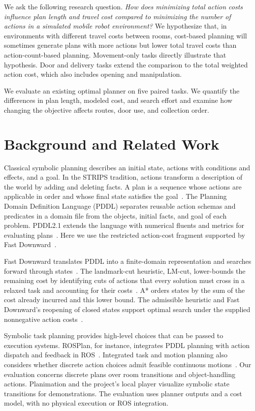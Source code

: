 \documentclass[conference,a4paper]{IEEEtran}
\theoremstyle{plain}
\theoremstyle{definition}
\theoremstyle{remark}
\begin{document}
We ask the following research question. \emph{How does minimizing total action costs influence plan length and travel cost compared to minimizing the number of actions in a simulated mobile robot environment?} We hypothesize that, in environments with different travel costs between rooms, cost-based planning will sometimes generate plans with more actions but lower total travel costs than action-count-based planning. Movement-only tasks directly illustrate that hypothesis. Door and delivery tasks extend the comparison to the total weighted action cost, which also includes opening and manipulation.

We evaluate an existing optimal planner on five paired tasks. We quantify the differences in plan length, modeled cost, and search effort and examine how changing the objective affects routes, door use, and collection order.

\section{Background and Related Work}
\label{sec:background}
Classical symbolic planning describes an initial state, actions with conditions and effects, and a goal. In the STRIPS tradition, actions transform a description of the world by adding and deleting facts. A plan is a sequence whose actions are applicable in order and whose final state satisfies the goal~\cite{fikes1971strips}. The Planning Domain Definition Language (PDDL) separates reusable action schemas and predicates in a domain file from the objects, initial facts, and goal of each problem. PDDL2.1 extends the language with numerical fluents and metrics for evaluating plans~\cite{fox2003pddl21}. Here we use the restricted action-cost fragment supported by Fast Downward~\cite{fd26pddl}.

Fast Downward translates PDDL into a finite-domain representation and searches forward through states~\cite{helmert2006fastdownward}. The landmark-cut heuristic, LM-cut, lower-bounds the remaining cost by identifying cuts of actions that every solution must cross in a relaxed task and accounting for their costs~\cite{helmert2009lmcut}. A* orders states by the sum of the cost already incurred and this lower bound. The admissible heuristic and Fast Downward's reopening of closed states support optimal search under the supplied nonnegative action costs~\cite{fd26eval,fd26astar}.

Symbolic task planning provides high-level choices that can be passed to execution systems. ROSPlan, for instance, integrates PDDL planning with action dispatch and feedback in ROS~\cite{cashmore2015rosplan}. Integrated task and motion planning also considers whether discrete action choices admit feasible continuous motions~\cite{garrett2021tamp}. Our evaluation concerns discrete plans over room transitions and object-handling actions. Planimation and the project's local player visualize symbolic state transitions for demonstrations. The evaluation uses planner outputs and a cost model, with no physical execution or ROS integration.
\end{document}
